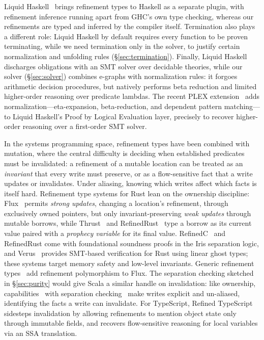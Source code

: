 \documentclass[acmsmall]{acmart}
\begin{document}
Liquid Haskell~\cite{vazou2014, vazou2017} brings refinement types to Haskell as a separate plugin, with refinement inference running apart from GHC's own type checking, whereas our refinements are typed and inferred by the compiler itself. Termination also plays a different role: Liquid Haskell by default requires every function to be proven terminating, while we need termination only in the solver, to justify certain normalization and unfolding rules (\S\ref{sec:termination}). Finally, Liquid Haskell discharges obligations with an SMT solver over decidable theories, while our solver (\S\ref{sec:solver}) combines e-graphs with normalization rules: it forgoes arithmetic decision procedures, but natively performs beta reduction and limited higher-order reasoning over predicate lambdas. The recent PLEX extension~\cite{ferrarini2026} adds normalization---eta-expansion, beta-reduction, and dependent pattern matching---to Liquid Haskell's Proof by Logical Evaluation layer, precisely to recover higher-order reasoning over a first-order SMT solver.

In the systems programming space, refinement types have been combined with mutation, where the central difficulty is deciding when established predicates must be invalidated: a refinement of a mutable location can be treated as an \emph{invariant} that every write must preserve, or as a flow-sensitive fact that a write updates or invalidates. Under aliasing, knowing which writes affect which facts is itself hard.
Refinement type systems for Rust lean on the ownership discipline: Flux~\cite{lehmann2023} permits \emph{strong updates}, changing a location's refinement, through exclusively owned pointers, but only invariant-preserving \emph{weak updates} through mutable borrows, while Thrust~\cite{thrust2025} and RefinedRust~\cite{gaher2024} type a borrow as its current value paired with a \emph{prophecy variable} for its final value.
RefinedC~\cite{sammler2021} and RefinedRust come with foundational soundness proofs in the Iris separation logic, and Verus~\cite{lattuada2023} provides SMT-based verification for Rust using linear ghost types; these systems target memory safety and low-level invariants. Generic refinement types~\cite{lehmann2025} add refinement polymorphism to Flux.
The separation checking sketched in \S\ref{sec:purity} would give Scala a similar handle on invalidation: like ownership, capabilities~\cite{xu2025} with separation checking~\cite{xu2026} make writes explicit and un-aliased, identifying the facts a write can invalidate. For TypeScript, Refined TypeScript~\cite{vekris2016} sidesteps invalidation by allowing refinements to mention object state only through immutable fields, and recovers flow-sensitive reasoning for local variables via an SSA translation.
\end{document}

